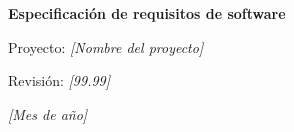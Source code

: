\documentclass[12pt,a4paper,oneside]{report}
\newcommand{\campo}[1]{\textit{[#1]}}
\begin{document}
\begin{titlepage}
    \centering
    \vspace*{3cm}
    {\Huge\bfseries Especificación de requisitos de software\par}
    \vspace{1.5cm}
    {\Large Proyecto: \campo{Nombre del proyecto}\par}
    \vspace{0.5cm}
    {\large Revisión: \campo{99.99}\par}
    \vfill
    {\large \campo{Mes de año}\par}
\end{titlepage}




\tableofcontents
\clearpage





\end{document}
